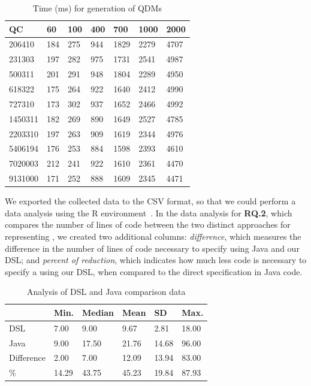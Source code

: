 \begin{table}[htb!]
\centering
\caption{Time (ms) for generation of QDMs}
\label{table:tempo}
\begin{center}
\begin{tabular}{lllllll}
\toprule
\textbf{QC}      & \textbf{60}  & \textbf{100} & \textbf{400}  & \textbf{700}  & \textbf{1000} & \textbf{2000} \\ \midrule

206410  & 184 & 275 & 944  & 1829 & 2279 & 4707 \\ %
231303  & 197 & 282 & 975  & 1731 & 2541 & 4987 \\ %
500311  & 201 & 291 & 948  & 1804 & 2289 & 4950 \\ %
618322  & 175 & 264 & 922  & 1640 & 2412 & 4990 \\ %
727310  & 173 & 302 & 937  & 1652 & 2466 & 4992 \\ %
1450311 & 182 & 269 & 890  & 1649 & 2527 & 4785 \\ %
2203310 & 197 & 263 & 909  & 1619 & 2344 & 4976 \\ %
5406194 & 176 & 253 & 884  & 1598 & 2393 & 4610 \\ %
7020003 & 212 & 241 & 922  & 1610 & 2361 & 4470 \\ %
9131000 & 171 & 252 & 888  & 1609 & 2345 & 4471 \\ \bottomrule
\end{tabular}
\end{center}
\end{table}

We exported the collected data to the CSV format, so that we could perform a data analysis using the R environment~\cite{crawley2013}. 
In the data analysis for \textbf{RQ.2}, which compares the number of lines of code between the two distinct approaches for 
representing \callers, we created two additional columns: \emph{difference}, which measures the difference in the number of 
lines of code necessary to specify \callers using Java and our DSL; and \emph{percent of reduction}, which indicates 
how much less code is necessary to specify a \shc using our DSL, when compared to the direct specification in Java code.

\begin{table}[htb!]
\centering
\caption{Analysis of DSL and Java comparison data}
\label{table:analiseComparacao}
\begin{center}
\begin{tabular}{llllll}
\toprule
           & \textbf{Min.}  & \textbf{Median} & \textbf{Mean}  & \textbf{SD}    & \textbf{Max.}  \\ \midrule
DSL        & 7.00  & 9.00   & 9.67  & 2.81  & 18.00 \\ %
Java       & 9.00  & 17.50  & 21.76 & 14.68 & 96.00 \\ %
Difference & 2.00  & 7.00   & 12.09 & 13.94 & 83.00 \\ %
\%         & 14.29 & 43.75  & 45.23 & 19.84 & 87.93 \\ \bottomrule
\end{tabular}
\end{center}
\end{table}

